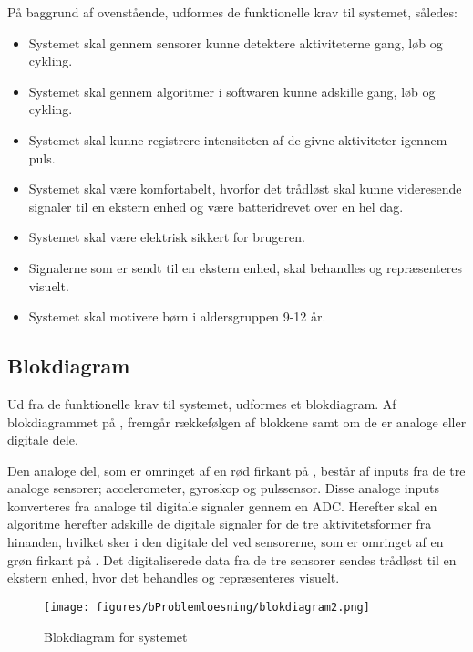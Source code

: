 På baggrund af ovenstående, udformes de funktionelle krav til systemet, således: 
\begin{itemize}
	\item Systemet skal gennem sensorer kunne detektere aktiviteterne gang, løb og cykling.
	\item Systemet skal gennem algoritmer i softwaren kunne adskille gang, løb og cykling.
	\item Systemet skal kunne registrere intensiteten af de givne aktiviteter igennem puls.
	\item Systemet skal være komfortabelt, hvorfor det trådløst skal kunne videresende signaler til en ekstern enhed og være batteridrevet over en hel dag.
	\item Systemet skal være elektrisk sikkert for brugeren.
	\item Signalerne som er sendt til en ekstern enhed, skal behandles og repræsenteres visuelt.
	\item Systemet skal motivere børn i aldersgruppen 9-12 år. 
\end{itemize}

\subsection{Blokdiagram}
Ud fra de funktionelle krav til systemet, udformes et blokdiagram. \newline
Af blokdiagrammet på , fremgår rækkefølgen af blokkene samt om de er analoge eller digitale dele. 

Den analoge del, som er omringet af en rød firkant på , består af inputs fra de tre analoge sensorer; accelerometer, gyroskop og pulssensor. Disse analoge inputs konverteres fra analoge til digitale signaler gennem en ADC. Herefter skal en algoritme herefter adskille de digitale signaler for de tre aktivitetsformer fra hinanden, hvilket sker i den digitale del ved sensorerne, som er omringet af en grøn firkant på . Det digitaliserede data fra de tre sensorer sendes trådløst til en ekstern enhed, hvor det behandles og repræsenteres visuelt. 

 \begin{figure}[H]
 	\centering
 	\texttt{[image: figures/bProblemloesning/blokdiagram2.png]}
 	\caption{Blokdiagram for systemet}
 	\label{fig:blokdiagram}
 \end{figure}
